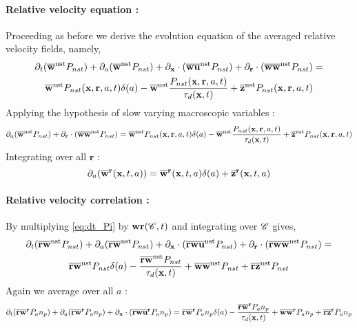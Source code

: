 \paragraph[short]{Relative velocity equation :}
Proceeding as before we derive the evolution equation of the averaged relative velocity fields, 
namely, 
\begin{multline}
    \partial_t (\overline{\textbf{w}}^\text{nst} P_{nst})
    + \partial_a (\overline{\textbf{w}}^\text{nst} P_{nst})
    + \partial_{\textbf{x}} \cdot (\overline{\textbf{w}\textbf{u} }^\text{nst} P_{nst})
    + \partial_{\textbf{r}}  \cdot (\overline{\textbf{w}\textbf{w}}^\text{nst} P_{nst})
    =  \\
    \overline{\textbf{w}}^\text{nst} P_{nst}(\textbf{x},\textbf{r},a,t)\delta(a)
    - \overline{\textbf{w}}^\text{nst}  \frac{P_{nst}(\textbf{x},\textbf{r},a,t)}{\tau_d(\textbf{x},t)}
    + \overline{\textbf{z}}^\text{nst}P_{nst}(\textbf{x},\textbf{r},a,t)
\end{multline}
Applying the hypothesis of slow varying macroscopic variables : 
\begin{equation}
    \partial_a (\overline{\textbf{w}}^\text{nst} P_{nst})
    +\partial_{\textbf{r}}  \cdot (\overline{\textbf{w}\textbf{w}}^\text{nst} P_{nst})
    =  
    \overline{\textbf{w}}^\text{nst} P_{nst}(\textbf{x},\textbf{r},a,t)\delta(a)
    - \overline{\textbf{w}}^\text{nst}  \frac{P_{nst}(\textbf{x},\textbf{r},a,t)}{\tau_d(\textbf{x},t)}
    + \overline{\textbf{z}}^\text{nst}P_{nst}(\textbf{x},\textbf{r},a,t)
\end{equation}
Integrating over all $\textbf{r}$ :
\begin{equation}
    \partial_a (\overline{\textbf{w}}^{\textbf{r}}(\textbf{x},t,a))
    =  
    \overline{\textbf{w}}^{\textbf{r}}(\textbf{x},t,a)\delta(a)
    + \overline{\textbf{z}}^{\textbf{r}}(\textbf{x},t,a)
    \label{eq:da_w}
\end{equation}
 
\paragraph{Relative velocity correlation :}
By multiplying \ref{eq:dt_Pi} by $\textbf{wr} (\mathscr{C},t)$ and integrating over $\mathscr{C}$ gives,
\begin{multline}
    \partial_t (\overline{\textbf{rw}}^\text{nst} P_{nst})
    + \partial_a (\overline{\textbf{rw}}^\text{nst} P_{nst})
    + \partial_{\textbf{x}} \cdot (\overline{\textbf{rw}\textbf{u} }^\text{nst} P_{nst})
    + \partial_{\textbf{r}}  \cdot (\overline{\textbf{rw}\textbf{w}}^\text{nst} P_{nst})
    =  \\
    \overline{\textbf{rw}}^\text{nst} P_{nst}\delta(a)
    -  \frac{\overline{\textbf{rw}}^\text{nst} P_{nst}}{\tau_d(\textbf{x},t)}
    + \overline{\textbf{ww}}^\text{nst}P_{nst}
    + \overline{\textbf{rz}}^\text{nst}P_{nst}
\end{multline}
Again we average over all $a$ : 
\begin{multline}
    \partial_t (\overline{\textbf{rw}}^{\textbf{r}} P_{a}n_p)
    + \partial_a (\overline{\textbf{rw}}^{\textbf{r}} P_{a}n_p)
    + \partial_{\textbf{x}} \cdot (\overline{\textbf{rw}\textbf{u} }^{\textbf{r}} P_{a}n_p)
    =  
    \overline{\textbf{rw}}^{\textbf{r}} P_{a}n_p\delta(a)
    -  \frac{\overline{\textbf{rw}}^{\textbf{r}} P_{a}n_p}{\tau_d(\textbf{x},t)}
    + \overline{\textbf{ww}}^{\textbf{r}}P_{a}n_p
    + \overline{\textbf{rz}}^{\textbf{r}}P_{a}n_p
\end{multline}